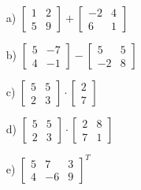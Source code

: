 \begin{itemize}
    \item[a) ]	
    			$ 
    			\begin{bmatrix}
    			1 & 2 \\
    			5 & 9
    			\end{bmatrix}
    			+
    			\begin{bmatrix}
    			-2 & 4 \\
    			6  & 1
    			\end{bmatrix}
    			$
    \item[b) ]	
    			$ 
    			\begin{bmatrix}
    			5 & -7 \\
    			4 & -1
    			\end{bmatrix}
    			-
    			\begin{bmatrix}
    			5   & 5 \\
    			-2  & 8
    			\end{bmatrix}
    			$
    			
    \item[c) ]	
    			$ 
    			\begin{bmatrix}
    			5  & 5 \\
    			2  & 3
    			\end{bmatrix}
    			\cdot
    			\begin{bmatrix}
    			2   \\
    			7  
    			\end{bmatrix}
    			$
    			
    \item[d) ]	
    			$ 
    			\begin{bmatrix}
    			5  & 5 \\
    			2  & 3
    			\end{bmatrix}
    			\cdot
    			\begin{bmatrix}
    			2 & 8  \\
    			7 & 1
    			\end{bmatrix}
    			$
    \item[e) ]	
    			$ 
    			\begin{bmatrix}
    			5 & 7  & 3 \\
    			4 & -6 & 9
    			\end{bmatrix}
    			^{T}
    			$
    		
\end{itemize}